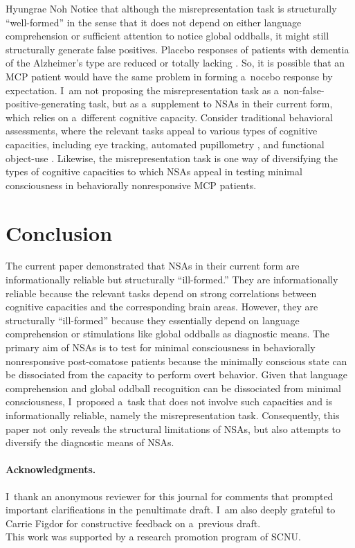 \begin{artengenv}{Hyungrae Noh}
Notice that although the misrepresentation task is structurally ``well-formed'' in the sense that it does not depend on either language comprehension or sufficient attention to notice global oddballs, it might still structurally generate false positives. Placebo responses of patients with dementia of the Alzheimer's type are reduced or totally lacking
\parencite[][p.349]{benedetti_how_2011}. %
 So, it is possible that an MCP patient would have the same problem in forming a~nocebo response by expectation. I~am not proposing the misrepresentation task as a~non-false-positive-generating task, but as a~supplement to NSAs in their current form, which relies on a~different cognitive capacity. Consider traditional behavioral assessments, where the relevant tasks appeal to various types of cognitive capacities, including eye tracking, automated pupillometry 
\parencite[][]{vassilieva_automated_2019}, %
 and functional object-use 
\parencite[][]{sun_personalized_2018}. %
 Likewise, the misrepresentation task is one way of diversifying the types of cognitive capacities to which NSAs appeal in testing minimal consciousness in behaviorally nonresponsive MCP patients.

\section{Conclusion}
The current paper demonstrated that NSAs in their current form are informationally reliable but structurally ``ill-formed.'' They are informationally reliable because the relevant tasks depend on strong correlations between cognitive capacities and the corresponding brain areas. However, they are structurally ``ill-formed'' because they essentially depend on language comprehension or stimulations like global oddballs as diagnostic means. The primary aim of NSAs is to test for minimal consciousness in behaviorally nonresponsive post-comatose patients because the minimally conscious state can be dissociated from the capacity to perform overt behavior. Given that language comprehension and global oddball recognition can be dissociated from minimal consciousness, I~proposed a~task that does not involve such capacities and is informationally reliable, namely the misrepresentation task. Consequently, this paper not only reveals the structural limitations of NSAs, but also attempts to diversify the diagnostic means of NSAs.

\paragraph{Acknowledgments.}
I~thank an anonymous reviewer for this journal for comments that prompted important clarifications in the penultimate draft. I~am also deeply grateful to Carrie Figdor for constructive feedback on a~previous draft.\\
This work was supported by a research promotion program of SCNU.


\end{artengenv}


